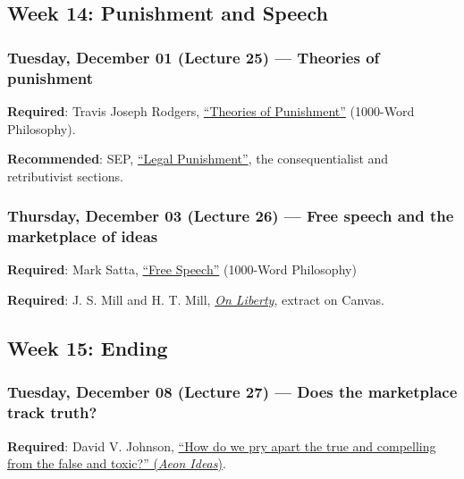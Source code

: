 \documentclass[
  letterpaper,
  DIV=11,
  numbers=noendperiod]{scrartcl}
\begin{document}
\subsection{Week 14: Punishment and
Speech}\label{week-14-punishment-and-speech}

\subsubsection{Tuesday, December 01 (Lecture 25) --- Theories of
punishment}\label{tuesday-december-01-lecture-25-theories-of-punishment}

\textbf{Required}: Travis Joseph Rodgers,
\href{https://1000wordphilosophy.com/2019/02/05/theories-of-punishment/}{``Theories
of Punishment''} (1000-Word Philosophy).

\textbf{Recommended}: SEP,
\href{https://plato.stanford.edu/entries/legal-punishment/}{``Legal
Punishment''}, the consequentialist and retributivist sections.

\subsubsection{Thursday, December 03 (Lecture 26) --- Free speech and
the marketplace of
ideas}\label{thursday-december-03-lecture-26-free-speech-and-the-marketplace-of-ideas}

\textbf{Required}: Mark Satta,
\href{https://1000wordphilosophy.com/2021/02/04/free-speech/}{``Free
Speech''} (1000-Word Philosophy)

\textbf{Required}: J. S. Mill and H. T. Mill,
\href{https://www.gutenberg.org/files/34901/34901-h/34901-h.htm}{\emph{On
Liberty}}, extract on Canvas.

\subsection{Week 15: Ending}\label{week-15-ending}

\subsubsection{Tuesday, December 08 (Lecture 27) --- Does the
marketplace track
truth?}\label{tuesday-december-08-lecture-27-does-the-marketplace-track-truth}

\textbf{Required}: David V. Johnson,
\href{https://aeon.co/ideas/how-do-we-pry-apart-the-true-and-compelling-from-the-false-and-toxic}{``How
do we pry apart the true and compelling from the false and toxic?''
(\emph{Aeon Ideas})}.
\end{document}
